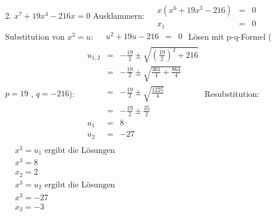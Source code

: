 \begin{itemize}        
    \item[2.] $x^7 + 19x^4 - 216x = 0 $\newline\newline
        Ausklammern:\newline
		$\begin{array}{crcl}
			&x(x^6+19x^3-216)&=&0\\
			&x_1&=&0
		\end{array}$           \newline  \newline   
        Substitution von \textit{$ x^3 = u $}: \newline
        $\begin{array}{crcl}
         &u^2 + 19u - 216 &=& 0 \\
        \end{array}$                \newline \newline
        Lösen mit p-q-Formel ($ p = 19 $ , $ q = -216 $): \newline 
        $\begin{array}{crcl}
         &u_{1,2} &=& - \frac {19} 2 \pm \sqrt{\left(\frac {19} 2 \right)^2 + 216} \\
         &&=& - \frac {19} 2 \pm \sqrt{\frac {361} 4 + \frac {864} 4}\\
         &&=& - \frac {19} 2 \pm \sqrt{\frac {1225} 4} \\
         &&=& - \frac {19} 2 \pm \frac {35} 2 \\
        &u_1 &=& 8 \\
        &u_2 &=& -27\\
        \end{array}$   \newline   \newline
        Resubstitution: \newline
        $\begin{array}{ll}
        &x^3 = u_1 \text{\ ergibt die Lösungen}\\
        &x^3 = 8 \\
        &x_2 = 2 \\[2ex]
        &x^3 = u_2 \text{\ ergibt die Lösungen}\\
        &x^3 = -27 \\
        &x_3 = -3\\
        \end{array}$
    
\end{itemize}

		
